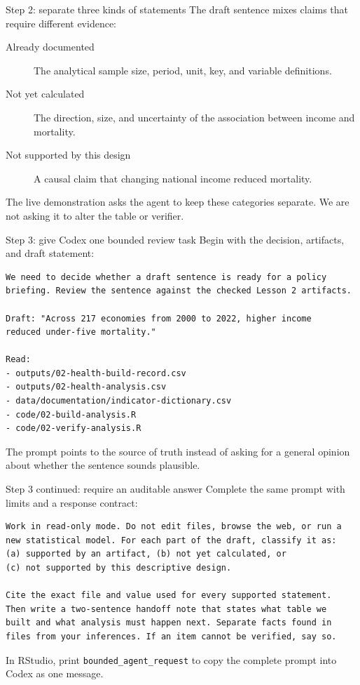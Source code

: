 \begin{frame}{Step 2: separate three kinds of statements}
  The draft sentence mixes claims that require different evidence:

  \begin{description}
    \item[Already documented] The analytical sample size, period, unit, key,
      and variable definitions.
    \item[Not yet calculated] The direction, size, and uncertainty of the
      association between income and mortality.
    \item[Not supported by this design] A causal claim that changing national
      income reduced mortality.
  \end{description}

  \vfill
  The live demonstration asks the agent to keep these categories separate. We
  are not asking it to alter the table or verifier.
\end{frame}

\begin{frame}[fragile]{Step 3: give Codex one bounded review task}
  Begin with the decision, artifacts, and draft statement:

\begin{lstlisting}[basicstyle=\ttfamily\scriptsize]
We need to decide whether a draft sentence is ready for a policy
briefing. Review the sentence against the checked Lesson 2 artifacts.

Draft: "Across 217 economies from 2000 to 2022, higher income
reduced under-five mortality."

Read:
- outputs/02-health-build-record.csv
- outputs/02-health-analysis.csv
- data/documentation/indicator-dictionary.csv
- code/02-build-analysis.R
- code/02-verify-analysis.R
\end{lstlisting}

  \vfill
  The prompt points to the source of truth instead of asking for a general
  opinion about whether the sentence sounds plausible.
\end{frame}

\begin{frame}[fragile]{Step 3 continued: require an auditable answer}
  Complete the same prompt with limits and a response contract:

\begin{lstlisting}[basicstyle=\ttfamily\scriptsize]
Work in read-only mode. Do not edit files, browse the web, or run a
new statistical model. For each part of the draft, classify it as:
(a) supported by an artifact, (b) not yet calculated, or
(c) not supported by this descriptive design.

Cite the exact file and value used for every supported statement.
Then write a two-sentence handoff note that states what table we
built and what analysis must happen next. Separate facts found in
files from your inferences. If an item cannot be verified, say so.
\end{lstlisting}

  \vfill
  In RStudio, print \texttt{bounded\_agent\_request} to copy the complete
  prompt into Codex as one message.
\end{frame}

